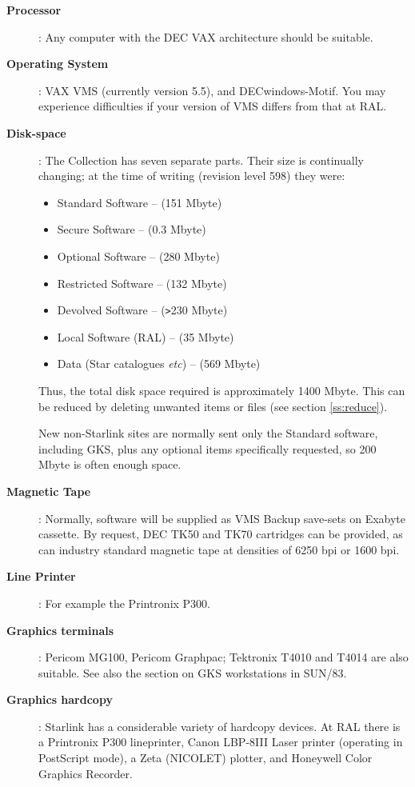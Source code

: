 \begin{description}

\item [\bf Processor]: Any computer with the DEC VAX architecture should be
suitable.

\item [\bf Operating System]: VAX VMS (currently version 5.5), and
DECwindows-Motif. You may experience difficulties if your version of VMS
differs from that at RAL.

\item [\bf Disk-space]: The Collection has seven separate parts. Their size is
continually changing; at the time of writing (revision level 598) they were:

\begin{itemize}
\item Standard Software -- (151 Mbyte)
\item Secure Software -- (0.3 Mbyte)
\item Optional Software --  (280 Mbyte)
\item Restricted Software -- (132 Mbyte)
\item Devolved Software -- (\verb+>+230 Mbyte)
\item Local Software (RAL) -- (35 Mbyte)
\item Data (Star catalogues {\em etc}) -- (569 Mbyte)
\end{itemize}

Thus, the total disk space required is approximately 1400 Mbyte. This can be
reduced by deleting unwanted items or files (see section \ref{ss:reduce}).

New non-Starlink sites are normally sent only the Standard software, including
GKS, plus any optional items specifically requested, so 200 Mbyte is often
enough space.

\item [\bf Magnetic Tape]: Normally, software will be supplied as VMS Backup
save-sets on Exabyte cassette. By request, DEC TK50 and TK70 cartridges can be
provided, as can industry standard magnetic tape at densities of 6250 bpi or
1600 bpi.

\item [\bf Line Printer]: For example the Printronix P300.

\item [\bf Graphics terminals]: Pericom MG100, Pericom Graphpac; Tektronix
T4010 and T4014 are also suitable. See also the section on GKS workstations in
SUN/83.

\item [\bf Graphics hardcopy]: Starlink has a considerable variety of hardcopy
devices. At RAL there is a Printronix P300 lineprinter, Canon LBP-8III Laser
printer (operating in PostScript mode), a Zeta (NICOLET) plotter, and Honeywell
Color Graphics Recorder.


\end{description}
